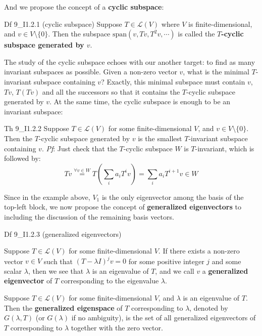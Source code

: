 \documentclass{article}
\begin{document}
And we propose the concept of a \textbf{cyclic subspace}:

\begin{Df}{Df 9\_I1.2.1 (cyclic subspace)}
    Suppose $T\in\mathcal{L}(V)$ where $V$ is finite-dimensional, and $v\in V\setminus\{0\}$. Then the subspace $\text{span}(v, Tv, T^2v, \cdots)$ is called the \textbf{$T$-cyclic subspace generated by $v$}.
\end{Df}

The study of the cyclic subspace echoes with our another target: to find as many invariant subspaces as possible. Given a non-zero vector $v$, what is the minimal $T$-invariant subspace containing $v$? Exactly, this minimal subspace must contain $v$, $Tv$, $T(Tv)$ and all the successors so that it contains the $T$-cyclic subspace generated by $v$. At the same time, the cyclic subspace is enough to be an invariant subspace:

\begin{Th}{Th 9\_I1.2.2}
    Suppose $T\in\mathcal{L}(V)$ for some finite-dimensional $V$, and $v\in V\setminus\{0\}$. Then the $T$-cyclic subspace generated by $v$ is the smallest $T$-invariant subspace containing $v$.
    \tcblower
    \textit{Pf}: Just check that the $T$-cyclic subspace $W$ is $T$-invariant, which is followed by:
    $$ Tv\overset{\forall v\in W}{=} T\left(\sum_{i} a_iT^iv\right) = \sum_{i} a_iT^{i+1}v \in W $$
\end{Th}

Since in the example above, $V_1$ is the only eigenvector among the basis of the top-left block, we now propose the concept of \textbf{generalized eigenvectors} to including the discussion of the remaining basis vectors.

\begin{Df}{Df 9\_I1.2.3 (generalized eigenvectors)}
    \begin{compactenum}
        \item Suppose $T\in\mathcal{L}(V)$ for some finite-dimensional $V$. If there exists a non-zero vector $v\in V$ such that $(T-\lambda I)^jv = 0$ for some positive integer $j$ and some scalar $\lambda$, then we see that $\lambda$ is an eigenvalue of $T$, and we call $v$ a \textbf{generalized eigenvector} of $T$ corresponding to the eigenvalue $\lambda$.
        \item Suppose $T\in\mathcal{L}(V)$ for some finite-dimensional $V$, and $\lambda$ is an eigenvalue of $T$. Then the \textbf{generalized eigenspace} of $T$ corresponding to $\lambda$, denoted by $G(\lambda, T)$ (or $G(\lambda)$ if no ambiguity), is the set of all generalized eigenvectors of $T$ corresponding to $\lambda$ together with the zero vector.
    \end{compactenum}
\end{Df}
\end{document}
